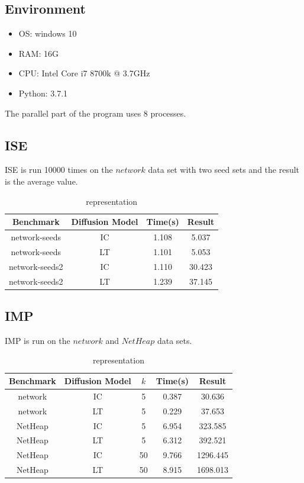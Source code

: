\documentclass[conference]{IEEEtran}
\begin{document}
\subsection{Environment}     
\begin{itemize}
    \item OS: windows 10
    \item RAM: 16G
    \item CPU: Intel Core i7 8700k @ 3.7GHz
    \item Python: 3.7.1
\end{itemize}
The parallel part of the program uses 8 processes.
\subsection{ISE}
ISE is run 10000 times on the $network$ data set with two seed sets and the result is the average value.
\begin{table}[H]
    \caption{representation}
    \centering
    \begin{tabular}{cccc}
    \toprule
    Benchmark&Diffusion Model&Time(s)&Result\\
    \midrule
    network-seeds&IC&1.108&5.037\\
    network-seeds&LT&1.101&5.053\\
    network-seeds2&IC&1.110&30.423\\
    network-seeds2&LT&1.239&37.145\\
    \bottomrule
    \end{tabular}
    \label{table:1}
    \end{table}

\subsection{IMP}
IMP is run on the $network$ and $NetHeap$ data sets.

\begin{table}[H]
    \caption{representation}
    \centering
    \begin{tabular}{ccccc}
    \toprule
    Benchmark&Diffusion Model&$k$&Time(s)&Result\\
    \midrule
    network&IC&5&0.387&30.636\\
    network&LT&5&0.229&37.653\\
    NetHeap&IC&5&6.954&323.585\\
    NetHeap&LT&5&6.312&392.521\\
    NetHeap&IC&50&9.766&1296.445\\
    NetHeap&LT&50&8.915&1698.013\\
    
    \bottomrule
    \end{tabular}
    \label{table:1}
    \end{table}
\end{document}
